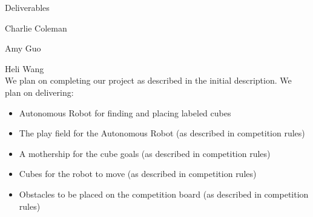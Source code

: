 \documentclass{article}
\begin{document}
	\begin{center}
		\begin{large}Deliverables\end{large}
	\end{center}
	
	\hfill Charlie Coleman
	
	\hfill Amy Guo

	\hfill Heli Wang \\
	
	\noindent We plan on completing our project as described in the initial description. We plan on delivering:
	
	\begin{itemize}[noitemsep]
		\item Autonomous Robot for finding and placing labeled cubes
		\item The play field for the Autonomous Robot (as described in competition rules)
		\item A mothership for the cube goals (as described in competition rules)
		\item Cubes for the robot to move (as described in competition rules)
		\item Obstacles to be placed on the competition board (as described in competition rules)
	\end{itemize}
	
		
	
\end{document}
